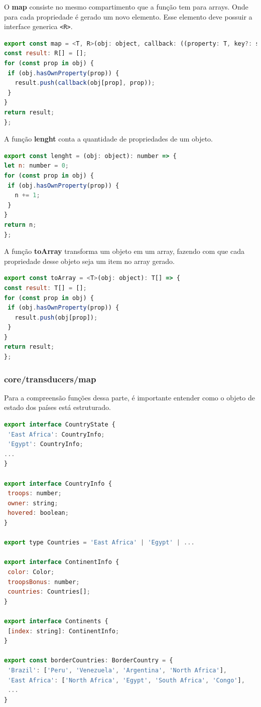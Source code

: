 \documentclass[rel_mlp]{iiufrgs}
\begin{document}
O \textbf{map} consiste no mesmo compartimento que a função tem para arrays. Onde para cada propriedade é gerado um novo elemento. Esse elemento deve possuir a interface generica \verb|<R>|.
\begin{lstlisting}[language = JavaScript]
export const map = <T, R>(obj: object, callback: ((property: T, key?: string) => R)): R[] => {
const result: R[] = [];
for (const prop in obj) {
 if (obj.hasOwnProperty(prop)) {
   result.push(callback(obj[prop], prop));
 }
}
return result;
};
\end{lstlisting}

A função \textbf{lenght} conta a quantidade de propriedades de um objeto.
\begin{lstlisting}[language = JavaScript]
export const lenght = (obj: object): number => {
let n: number = 0;
for (const prop in obj) {
 if (obj.hasOwnProperty(prop)) {
   n += 1;
 }
}
return n;
};
\end{lstlisting}

A função \textbf{toArray} transforma um objeto em um array, fazendo com que cada propriedade desse objeto seja um item no array gerado.
\begin{lstlisting}[language = JavaScript]
export const toArray = <T>(obj: object): T[] => {
const result: T[] = [];
for (const prop in obj) {
 if (obj.hasOwnProperty(prop)) {
   result.push(obj[prop]);
 }
}
return result;
};

\end{lstlisting}

\subsubsection{core/transducers/map}
Para a compreensão funções dessa parte, é importante entender como o objeto de estado dos países está estruturado.
\begin{lstlisting}[language=JavaScript]
export interface CountryState {
 'East Africa': CountryInfo;
 'Egypt': CountryInfo;
...
}

export interface CountryInfo {
 troops: number;
 owner: string;
 hovered: boolean;
}

export type Countries = 'East Africa' | 'Egypt' | ...

export interface ContinentInfo {
 color: Color;
 troopsBonus: number;
 countries: Countries[];
}

export interface Continents {
 [index: string]: ContinentInfo;
}

export const borderCountries: BorderCountry = {
 'Brazil': ['Peru', 'Venezuela', 'Argentina', 'North Africa'],
 'East Africa': ['North Africa', 'Egypt', 'South Africa', 'Congo'],
 ...
}
\end{lstlisting}
\end{document}
